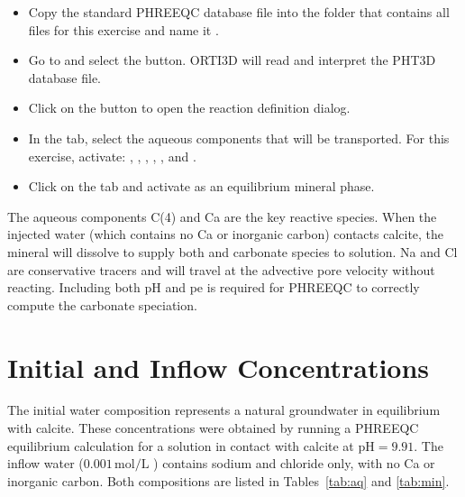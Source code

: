 \begin{itemize}

\item Copy the standard PHREEQC database file into the folder that
  contains all files for this exercise and name it
  .

\item Go to  and select the
   button.  ORTI3D will read and interpret the
  PHT3D database file.

\item Click on the  button to open the reaction
  definition dialog.

\item In the  tab, select the aqueous components that will
  be transported.  For this exercise, activate: , ,
  , , , and .

\item Click on the  tab and activate  as an
  equilibrium mineral phase.

\end{itemize}

\begin{tcolorbox}[notebox, title={Note}]
The aqueous components C(4) and Ca are the key reactive species.  When
the injected  water (which contains no Ca or inorganic carbon)
contacts calcite, the mineral will dissolve to supply both 
and carbonate species to solution.  Na and Cl are conservative tracers
and will travel at the advective pore velocity without reacting.
Including both pH and pe is required for PHREEQC to correctly compute
the carbonate speciation.
\end{tcolorbox}

\section{Initial and Inflow Concentrations}

The initial water composition represents a natural groundwater in
equilibrium with calcite.  These concentrations were obtained by running
a PHREEQC equilibrium calculation for a solution in contact with calcite
at $\mathrm{pH} = 9.91$.  The inflow water ($0.001\,\mathrm{mol/L}$
) contains sodium and chloride only, with no Ca or inorganic
carbon.  Both compositions are listed in Tables~\ref{tab:aq} and
\ref{tab:min}.


